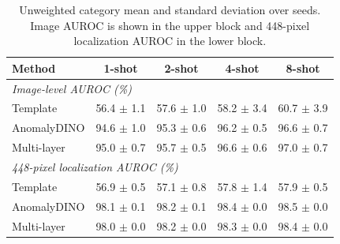 \begin{table}[t]
\centering
\small
\caption{Unweighted category mean and standard deviation over seeds.
Image AUROC is shown in the upper block and 448-pixel localization
AUROC in the lower block.}
\label{tab:main}
\begin{tabular}{lcccc}
\toprule
Method & 1-shot & 2-shot & 4-shot & 8-shot \\
\midrule
\multicolumn{5}{l}{\emph{Image-level AUROC (\%)}}\\
Template & 56.4 $\pm$ 1.1 & 57.6 $\pm$ 1.0 & 58.2 $\pm$ 3.4 & 60.7 $\pm$ 3.9 \\
AnomalyDINO & 94.6 $\pm$ 1.0 & 95.3 $\pm$ 0.6 & 96.2 $\pm$ 0.5 & 96.6 $\pm$ 0.7 \\
Multi-layer & 95.0 $\pm$ 0.7 & 95.7 $\pm$ 0.5 & 96.6 $\pm$ 0.6 & 97.0 $\pm$ 0.7 \\
\midrule
\multicolumn{5}{l}{\emph{448-pixel localization AUROC (\%)}}\\
Template & 56.9 $\pm$ 0.5 & 57.1 $\pm$ 0.8 & 57.8 $\pm$ 1.4 & 57.9 $\pm$ 0.5 \\
AnomalyDINO & 98.1 $\pm$ 0.1 & 98.2 $\pm$ 0.1 & 98.4 $\pm$ 0.0 & 98.5 $\pm$ 0.0 \\
Multi-layer & 98.0 $\pm$ 0.0 & 98.2 $\pm$ 0.0 & 98.3 $\pm$ 0.0 & 98.4 $\pm$ 0.0 \\
\bottomrule
\end{tabular}
\end{table}
